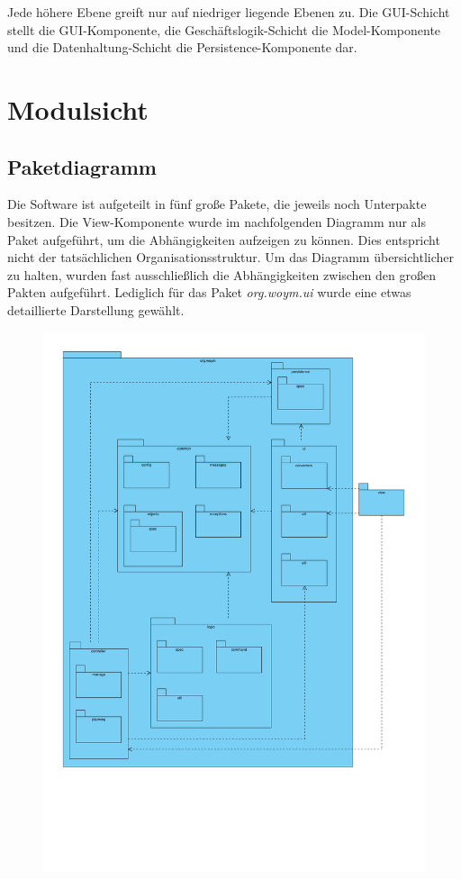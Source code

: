 \documentclass[fontsize=12pt,paper=a4,twoside]{scrartcl}
\begin{document}
Jede höhere Ebene greift nur auf niedriger liegende Ebenen zu. Die GUI-Schicht stellt die GUI-Komponente, die Geschäftslogik-Schicht die Model-Komponente und die Datenhaltung-Schicht die Persistence-Komponente dar.

\clearpage

\section{Modulsicht}
\label{sec:modulsicht}

\subsection{Paketdiagramm}
Die Software ist aufgeteilt in fünf große Pakete, die jeweils noch Unterpakte besitzen. Die View-Komponente wurde im nachfolgenden Diagramm nur als Paket aufgeführt, um die Abhängigkeiten aufzeigen zu können. Dies entspricht nicht der tatsächlichen Organisationsstruktur. Um das Diagramm übersichtlicher zu halten, wurden fast ausschließlich die Abhängigkeiten zwischen den großen Pakten aufgeführt. Lediglich für das Paket \textit{org.woym.ui} wurde eine etwas detaillierte Darstellung gewählt.

\begin{figure}[H]
\centering
\includegraphics[width=\textwidth]{packages.pdf}
\end{figure}
\end{document}

